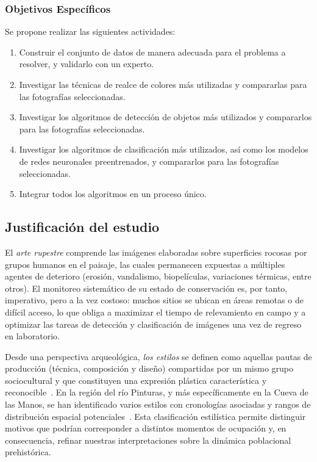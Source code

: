 \subsubsection{Objetivos Específicos}

Se propone realizar las siguientes actividades:
\begin{enumerate}
    \item Construir el conjunto de datos de manera adecuada para el problema a resolver, y validarlo con un experto.
    \item Investigar las técnicas de realce de colores más utilizadas y compararlas para las fotografías seleccionadas.
    \item Investigar los algoritmos de detección de objetos más utilizados y compararlos para las fotografías seleccionadas.
    \item Investigar los algoritmos de clasificación más utilizados, así como los modelos de redes neuronales preentrenados, y compararlos para las fotografías seleccionadas.
    \item Integrar todos los algoritmos en un proceso único.
\end{enumerate}

\subsection{Justificación del estudio}

El \emph{arte rupestre} comprende las imágenes elaboradas sobre superficies rocosas por grupos humanos en el paisaje, las cuales permanecen expuestas a múltiples agentes de deterioro (erosión, vandalismo, biopelículas, variaciones térmicas, entre otros).
El monitoreo sistemático de su estado de conservación es, por tanto, imperativo, pero a la vez costoso: muchos sitios se ubican en áreas remotas o de difícil acceso, lo que obliga a maximizar el tiempo de relevamiento en campo y a optimizar las tareas de detección y clasificación de imágenes una vez de regreso en laboratorio.

Desde una perspectiva arqueológica, \emph{los estilos} se definen como aquellas pautas de producción (técnica, composición y diseño) compartidas por un mismo grupo sociocultural y que constituyen una expresión plástica característica y reconocible~\cite{wiessner1983,aschero2012}.
En la región del río Pinturas, y más específicamente en la Cueva de las Manos, se han identificado varios estilos con cronologías asociadas y rangos de distribución espacial potenciales~\cite{gradin1978,gradin1979,aschero2018b}.
Esta clasificación estilística permite distinguir motivos que podrían corresponder a distintos momentos de ocupación y, en consecuencia, refinar nuestras interpretaciones sobre la dinámica poblacional prehistórica.

